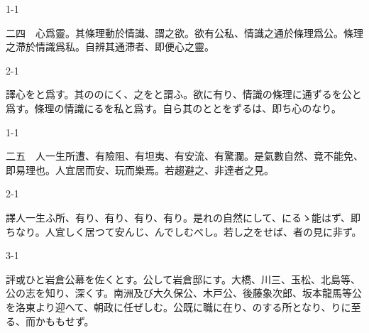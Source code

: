\documentclass[tate,paper=b6j,jafontsize=9pt]{jlreq}
\begin{document}
\begin{azconvIndented}{1\zw}{-1\zw}

二四　心爲靈。其條理動於情識、謂之欲。欲有公私、情識之通於條理爲公。條理之滯於情識爲私。自辨其通滯者、即便心之靈。

\end{azconvIndented}
\begin{azconvIndented}{2\zw}{-1\zw}

譯心をと爲す。其ののにく、之をと謂ふ。欲に有り、情識の條理に通ずるを公と爲す。條理の情識にるを私と爲す。自ら其のととをずるは、即ち心のなり。

\end{azconvIndented}

\begin{azconvIndented}{1\zw}{-1\zw}

二五　人一生所遭、有險阻、有坦夷、有安流、有驚瀾。是氣數自然、竟不能免、即易理也。人宜居而安、玩而樂焉。若趨避之、非達者之見。

\end{azconvIndented}
\begin{azconvIndented}{2\zw}{-1\zw}

譯人一生ふ所、有り、有り、有り、有り。是れの自然にして、にるゝ能はず、即ちなり。人宜しく居つて安んじ、んでしむべし。若し之をせば、者の見に非ず。

\end{azconvIndented}
\begin{azconvIndented}{3\zw}{-1\zw}

評或ひと岩倉公幕を佐くとす。公して岩倉邸にす。大橋、川三、玉松、北島等、公の志を知り、深くす。南洲及び大久保公、木戸公、後藤象次郎、坂本龍馬等公を洛東より迎へて、朝政に任ぜしむ。公既に職に在り、のする所となり、りに至る、而かももせず。

\end{azconvIndented}
\end{document}
